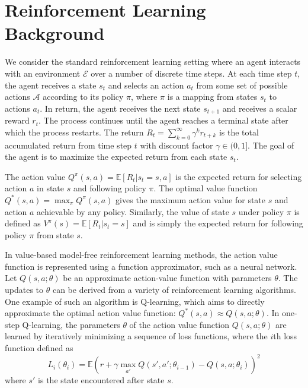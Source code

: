 \documentclass{article} %
\begin{document}
%
\vspace{-0.1cm}
\section{Reinforcement Learning Background}
\label{sec:background}

We consider the standard reinforcement learning setting where an agent interacts with an environment $\mathcal{E}$ over a number of discrete time steps.
%
At each time step $t$, the agent receives a state $s_t$ and selects an action $a_t$ from some set of possible actions $\mathcal{A}$ according to its policy $\pi$, where $\pi$ is a mapping from states $s_t$ to actions $a_t$.
In return, the agent receives the next state $s_{t+1}$ and receives a scalar reward $r_t$.
The process continues until the agent reaches a terminal state after which the process restarts.
%
The return $R_t = \sum_{k=0}^{\infty} \gamma^k r_{t+k}$ is the total accumulated return from time step $t$ with discount factor $\gamma \in (0,1]$.
The goal of the agent is to maximize the expected return from each state $s_t$.

The action value $Q^{\pi}(s,a) = \mathbb{E}\left[R_t|s_t=s, a\right]$ is the expected return for selecting action $a$ in state $s$ and following policy $\pi$.
The optimal value function $Q^*(s,a) = \max_{\pi} Q^{\pi}(s,a)$ gives the maximum action value for state $s$ and action $a$ achievable by any policy.
Similarly, the value of state $s$ under policy $\pi$ is defined as $V^{\pi}(s) = \mathbb{E}\left[R_t|s_t=s\right]$ and is simply the expected return for following policy $\pi$ from state $s$.

In value-based model-free reinforcement learning methods, the action value function is represented using a function approximator, such as a neural network.
Let $Q(s,a;\theta)$ be an approximate action-value function with parameters $\theta$.
The updates to $\theta$ can be derived from a variety of reinforcement learning algorithms.
One example of such an algorithm is Q-learning, which aims to directly approximate the optimal action value function: $Q^*(s,a)\approx Q(s,a;\theta)$.
In one-step Q-learning, the parameters $\theta$ of the action value function $Q(s,a;\theta)$ are learned by iteratively minimizing a sequence of loss functions, where the $i$th loss function defined as
\begin{equation*}
    L_i(\theta_i) = \mathbb{E}\left(r + \gamma \max_{a'}Q(s', a';\theta_{i-1}) - Q(s,a;\theta_i) \right)^2
\end{equation*}
where $s'$ is the state encountered after state $s$.
\end{document}
